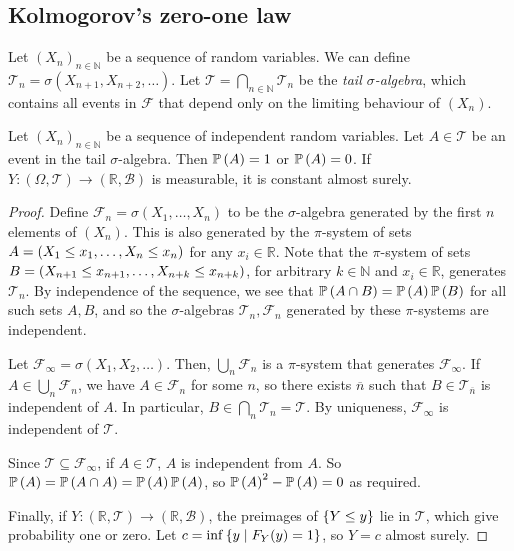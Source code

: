 \subsection{Kolmogorov's zero-one law}
Let \( (X_n)_{n \in \mathbb N} \) be a sequence of random variables.
We can define \( \mathcal T_n = \sigma(X_{n+1}, X_{n+2}, \dots) \).
Let \( \mathcal T = \bigcap_{n \in \mathbb N} \mathcal T_n \) be the \emph{tail \( \sigma \)-algebra}, which contains all events in \( \mathcal F \) that depend only on the limiting behaviour of \( (X_n) \).
\begin{theorem}
	Let \( (X_n)_{n \in \mathbb N} \) be a sequence of independent random variables.
	Let \( A \in \mathcal T \) be an event in the tail \( \sigma \)-algebra.
	Then \( \mathbb{P}\left({A}\right) = 1 \) or \( \mathbb{P}\left({A}\right) = 0 \).
	If \( Y \colon (\Omega,\mathcal T) \to (\mathbb R,\mathcal B) \) is measurable, it is constant almost surely.
\end{theorem}
\begin{proof}
	Define \( \mathcal F_n = \sigma(X_1, \dots, X_n) \) to be the \( \sigma \)-algebra generated by the first \( n \) elements of \( (X_n) \).
	This is also generated by the \( \pi \)-system of sets \( A = \qty(X_1 \leq x_1, \dots, X_n \leq x_n) \) for any \( x_i \in \mathbb R \).
	Note that the \( \pi \)-system of sets \( B = \qty(X_{n+1} \leq x_{n+1}, \dots, X_{n+k} \leq x_{n+k}) \), for arbitrary \( k \in \mathbb N \) and \( x_i \in \mathbb R \), generates \( \mathcal T_n \).
	By independence of the sequence, we see that \( \mathbb{P}\left({A \cap B}\right) = \mathbb{P}\left({A}\right) \mathbb{P}\left({B}\right) \) for all such sets \( A, B \), and so the \( \sigma \)-algebras \( \mathcal T_n, \mathcal F_n \) generated by these \( \pi \)-systems are independent.

	Let \( \mathcal F_\infty = \sigma(X_1, X_2, \dots) \).
	Then, \( \bigcup_n \mathcal F_n \) is a \( \pi \)-system that generates \( \mathcal F_\infty \).
	If \( A \in \bigcup_n \mathcal F_n \), we have \( A \in \mathcal F_n \) for some \( n \), so there exists \( \overline n \) such that \( B \in \mathcal T_{\overline n} \) is independent of \( A \).
	In particular, \( B \in \bigcap_n \mathcal T_n = \mathcal T \).
	By uniqueness, \( \mathcal F_\infty \) is independent of \( \mathcal T \).

	Since \( \mathcal T \subseteq \mathcal F_\infty \), if \( A \in \mathcal T \), \( A \) is independent from \( A \).
	So \( \mathbb{P}\left({A}\right) = \mathbb{P}\left({A \cap A}\right) = \mathbb{P}\left({A}\right)\mathbb{P}\left({A}\right) \), so \( \mathbb{P}\left({A}\right)^2 - \mathbb{P}\left({A}\right) = 0 \) as required.

	Finally, if \( Y \colon (\mathbb R,\mathcal T) \to (\mathbb R,\mathcal B) \), the preimages of \( \qty{Y \leq y} \) lie in \( \mathcal T \), which give probability one or zero.
	Let \( c = \inf\qty{y \mid F_Y(y) = 1} \), so \( Y = c \) almost surely.
\end{proof}
